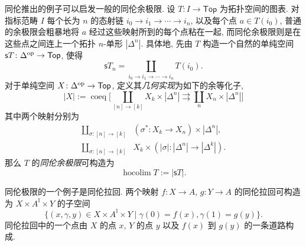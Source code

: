 \begin{remark}
	同伦推出的例子可以启发一般的同伦余极限. 设 $T\colon I\to \mathsf {Top}$ 为拓扑空间的图表. 对指标范畴 $I$ 每个长为 $n$ 的态射链 $i_0\to i_1\to\cdots\to i_n$, 以及每个点 $a\in T(i_0)$, 普通的余极限会粗暴地将 $a$ 经过这些映射所到的每个点粘在一起, 而同伦余极限则是在这些点之间连上一个拓扑 $n$-单形 $|\Delta^n|$.
	具体地, 先由 $T$ 构造一个自然的单纯空间
	$\mathsf s T\colon \Delta^{\op} \to\mathsf {Top}$, 使得 $$\mathsf s T_n = \coprod_{i_0\to i_1\to\cdots\to i_n} T(i_0).$$
	对于单纯空间 $X\colon \Delta^{\op} \to\mathsf {Top}$, 定义其\emph{几何实现}为如下的余等化子,
	$$
	|X|:= \operatorname{coeq}\Big[
	\coprod_{[n]\to [k]} X_k\times |\Delta^n|
	\rightrightarrows
	\coprod_{n}X_n\times |\Delta^n|
	\Big]
	$$
	其中两个映射分别为
	$$
	\begin{aligned}
		\coprod_{\sigma\colon  [n] \to [k]}& (\sigma^*\colon X_k \to X_n)\times |\Delta^n|,\\
		\coprod_{\sigma\colon  [n] \to [k]}& X_k\times (|\sigma|\colon |\Delta^n|\to |\Delta^k|).
	\end{aligned}
	$$
	那么 $T$ 的\emph{同伦余极限}可构造为
	$$
	\operatorname{hocolim}T := |\mathsf sT|.
	$$
	
	同伦极限的一个例子是同伦拉回. 两个映射 $f\colon X\to A$, $g\colon Y\to A$ 的同伦拉回可构造为 $X\times A^{\mathbb I}\times Y$ 的子空间
	$$
	\big\{ (x,\gamma,y)\in X\times A^{\mathbb I}\times Y\mid  \gamma(0)=f(x),\gamma(1)=g(y)\big\}.
	$$
	同伦拉回中的一个点由 $X$ 的点 $x$, $Y$ 的点 $y$ 以及 $f(x)$ 到 $g(y)$ 的一条道路构成.
	\begin{center}
		
		
		
		\begin{tikzpicture}[x=0.6pt,y=0.6pt,yscale=-1,xscale=1]
			

\end{tikzpicture}
\end{center}
\end{remark}
